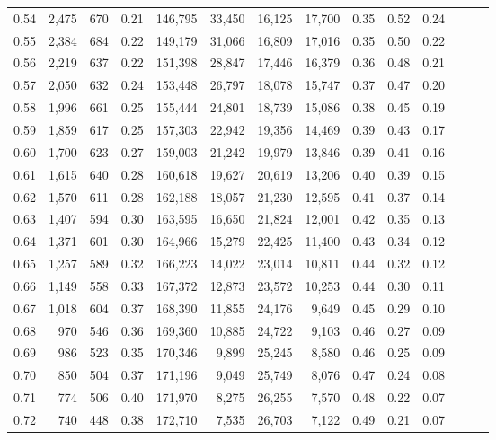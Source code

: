 \begin{tabular}{rrrrrrrrrrrrrr}
0.54 &  2,475 &  670 &  0.21 &  146,795 &   33,450 &  16,125 &  17,700 &  0.35 &  0.52 &      0.24 \\
0.55 &  2,384 &  684 &  0.22 &  149,179 &   31,066 &  16,809 &  17,016 &  0.35 &  0.50 &      0.22 \\
0.56 &  2,219 &  637 &  0.22 &  151,398 &   28,847 &  17,446 &  16,379 &  0.36 &  0.48 &      0.21 \\
0.57 &  2,050 &  632 &  0.24 &  153,448 &   26,797 &  18,078 &  15,747 &  0.37 &  0.47 &      0.20 \\
0.58 &  1,996 &  661 &  0.25 &  155,444 &   24,801 &  18,739 &  15,086 &  0.38 &  0.45 &      0.19 \\
0.59 &  1,859 &  617 &  0.25 &  157,303 &   22,942 &  19,356 &  14,469 &  0.39 &  0.43 &      0.17 \\
0.60 &  1,700 &  623 &  0.27 &  159,003 &   21,242 &  19,979 &  13,846 &  0.39 &  0.41 &      0.16 \\
0.61 &  1,615 &  640 &  0.28 &  160,618 &   19,627 &  20,619 &  13,206 &  0.40 &  0.39 &      0.15 \\
0.62 &  1,570 &  611 &  0.28 &  162,188 &   18,057 &  21,230 &  12,595 &  0.41 &  0.37 &      0.14 \\
0.63 &  1,407 &  594 &  0.30 &  163,595 &   16,650 &  21,824 &  12,001 &  0.42 &  0.35 &      0.13 \\
0.64 &  1,371 &  601 &  0.30 &  164,966 &   15,279 &  22,425 &  11,400 &  0.43 &  0.34 &      0.12 \\
0.65 &  1,257 &  589 &  0.32 &  166,223 &   14,022 &  23,014 &  10,811 &  0.44 &  0.32 &      0.12 \\
0.66 &  1,149 &  558 &  0.33 &  167,372 &   12,873 &  23,572 &  10,253 &  0.44 &  0.30 &      0.11 \\
0.67 &  1,018 &  604 &  0.37 &  168,390 &   11,855 &  24,176 &   9,649 &  0.45 &  0.29 &      0.10 \\
0.68 &    970 &  546 &  0.36 &  169,360 &   10,885 &  24,722 &   9,103 &  0.46 &  0.27 &      0.09 \\
0.69 &    986 &  523 &  0.35 &  170,346 &    9,899 &  25,245 &   8,580 &  0.46 &  0.25 &      0.09 \\
0.70 &    850 &  504 &  0.37 &  171,196 &    9,049 &  25,749 &   8,076 &  0.47 &  0.24 &      0.08 \\
0.71 &    774 &  506 &  0.40 &  171,970 &    8,275 &  26,255 &   7,570 &  0.48 &  0.22 &      0.07 \\
0.72 &    740 &  448 &  0.38 &  172,710 &    7,535 &  26,703 &   7,122 &  0.49 &  0.21 &      0.07 \\

\end{tabular}
